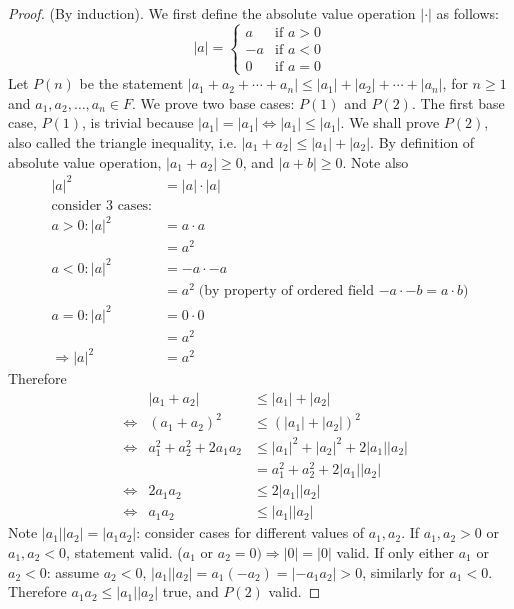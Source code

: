 \documentclass[11pt,twoside, reqno, align]{amsart}
\theoremstyle{remark}
\renewcommand{\implies}{\Rightarrow}
\renewcommand{\iff}{\Leftrightarrow}
\begin{document}
\begin{proof}
(By induction). We first define the absolute value operation $|\cdot|$ as follows:
$$
|a| = 
\begin{cases}
    a & \text{if $a > 0$}\\
    -a & \text{if $a < 0$}\\
    0 & \text{if $a = 0$}
\end{cases}
$$
Let $P(n)$ be the statement $|a_1+a_2+\cdots+a_n|\leq |a_1|+|a_2|+\cdots+|a_n|$, for $n \geq 1$ and $a_1, a_2, \dots, a_n \in F$. We prove two base cases: $P(1)$ and $P(2)$. The first base case, $P(1)$, is trivial because $|a_1| = |a_1| \iff |a_1| \leq |a_1|$. We shall prove $P(2)$, also called the triangle inequality, i.e. $|a_1+a_2|\leq |a_1|+|a_2|$. By definition of absolute value operation, $|a_1 + a_2| \geq 0$, and $|a+b| \geq 0$. Note also
\begin{align*}
    |a|^2 & = |a|\cdot|a| \\
    \text{consider 3 cases:} \\
    a > 0: |a|^2 & = a \cdot a \\
    & = a^2 \\
    a < 0: |a|^2 & = -a \cdot -a \\
    & = a^2 \;\text{(by property of ordered field $-a \cdot -b = a \cdot b$)} \\
    a = 0: |a|^2 & = 0 \cdot 0 \\
    & =a^2 \\
    \implies |a|^2 & = a^2
\end{align*}
Therefore
\begin{align*}
    & &|a_1 + a_2| & \leq |a_1| + |a_2| \\
    & \iff & (a_1 + a_2)^2 & \leq (|a_1| + |a_2|)^2 \\
    & \iff & a_1^2 + a_2^2 + 2a_1a_2 & \leq |a_1|^2 + |a_2|^2 + 2|a_1||a_2| \\
    & & & = a_1^2 + a_2^2 + 2|a_1||a_2| \\
    & \iff & 2a_1a_2 & \leq 2|a_1||a_2| \\
    & \iff & a_1a_2 & \leq |a_1||a_2|
\end{align*}
Note $|a_1||a_2| = |a_1a_2|$: consider cases for different values of $a_1,a_2$. If $a_1, a_2 > 0$ or $a_1, a_2 < 0$, statement valid. ($a_1$ or $a_2 = 0) \implies |0| = |0|$ valid. If only either $a_1$ or $a_2 < 0$: assume $a_2 < 0$, $|a_1||a_2| = a_1(-a_2) = |-a_1a_2| > 0$, similarly for $a_1 < 0$. Therefore $a_1a_2 \leq |a_1||a_2|$ true, and $P(2)$ valid.


\end{proof}
\end{document}
